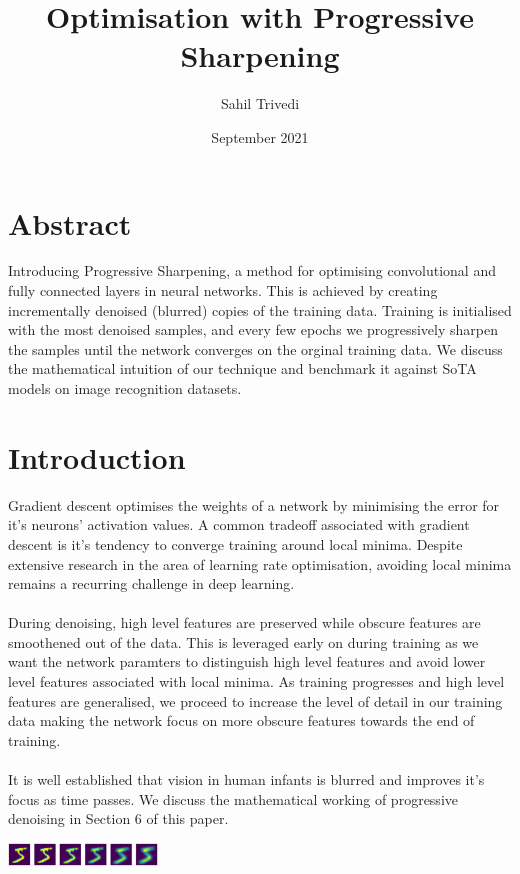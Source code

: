 \documentclass[12pt]{article}
\date{September 2021}
\title{Optimisation with Progressive Sharpening}
\author{Sahil Trivedi}
\begin{document}
	\maketitle
	
	\begin{multicols}{2}
		\section{Abstract}
		Introducing Progressive Sharpening, a method for optimising convolutional and fully connected layers in neural networks. This is achieved by creating incrementally denoised (blurred) copies of the training data. Training is initialised with the most denoised samples, and every few epochs we progressively sharpen the samples until the network converges on the orginal training data. We discuss the mathematical intuition of our technique and benchmark it against SoTA models on image recognition datasets. 
		
		\section{Introduction}
		Gradient descent optimises the weights of a network by minimising the error for it's neurons' activation values. A common tradeoff associated with gradient descent is it's tendency to converge training around local minima. Despite extensive research in the area of learning rate optimisation, avoiding local minima remains a recurring challenge in deep learning.
		\\\\
		During denoising, high level features are preserved while obscure features are smoothened out of the data. This is leveraged early on during training as we want the network paramters to distinguish high level features and avoid lower level features associated with local minima. As training progresses and high level features are generalised, we proceed to increase the level of detail in our training data making the network focus on more obscure features towards the end of training.
		\\\\
		It is well established that vision in human infants is blurred and improves it's focus as time passes. We discuss the mathematical working of progressive denoising in Section 6 of this paper.  
		
		\includegraphics[width=150px]{assets/denoise.png}

\end{multicols}
\end{document}
